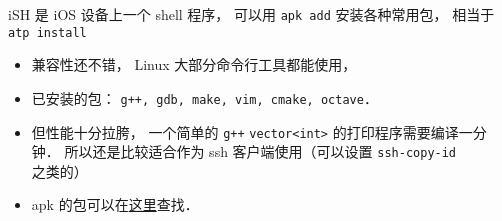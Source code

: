 
\begin{issues}
\issueDraft
\end{issues}

iSH 是 iOS 设备上一个 shell 程序， 可以用 \verb|apk add| 安装各种常用包， 相当于 \verb|atp install|

\begin{itemize}
\item 兼容性还不错， Linux 大部分命令行工具都能使用， \item 已安装的包： \verb|g++, gdb, make, vim, cmake, octave|．
\item 但性能十分拉胯， 一个简单的 \verb|g++| \verb|vector<int>| 的打印程序需要编译一分钟． 所以还是比较适合作为 ssh 客户端使用（可以设置 \verb|ssh-copy-id| 之类的）
\item apk 的包可以在\href{https://pkgs.alpinelinux.org/}{这里}查找．

\end{itemize}
